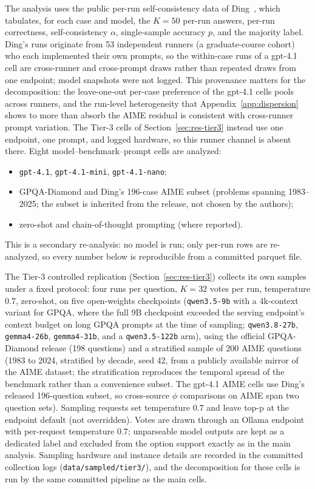 \documentclass{article}
\begin{document}
The analysis uses the public per-run self-consistency data of Ding~\cite{ding2026auditing}, which tabulates, for each case and model,
the $K=50$ per-run answers, per-run correctness, self-consistency $\alpha$, single-sample accuracy $p$, and the majority label.
Ding's runs originate from 53 independent runners (a graduate-course cohort) who each implemented their own prompts, so the within-case runs of a gpt-4.1 cell are cross-runner and cross-prompt draws rather than repeated draws from one endpoint; model snapshots were not logged. This provenance matters for the decomposition: the leave-one-out per-case preference of the gpt-4.1 cells pools across runners, and the run-level heterogeneity that Appendix~\ref{app:dispersion} shows to more than absorb the AIME residual is consistent with cross-runner prompt variation. The Tier-3 cells of Section~\ref{sec:res-tier3} instead use one endpoint, one prompt, and logged hardware, so this runner channel is absent there. Eight model--benchmark--prompt cells are analyzed:
\begin{itemize}
\item \texttt{gpt-4.1}, \texttt{gpt-4.1-mini}, \texttt{gpt-4.1-nano};
\item GPQA-Diamond and Ding's 196-case AIME subset (problems spanning
  1983--2025; the subset is inherited from the release, not chosen by the authors);
\item zero-shot and chain-of-thought prompting (where reported).
\end{itemize}
This is a secondary re-analysis: no model is run; only per-run rows are re-analyzed, so every number below is reproducible from a
committed parquet file.

The Tier-3 controlled replication (Section~\ref{sec:res-tier3})
collects its own samples under a fixed protocol: four runs per question,
$K=32$ votes per run, temperature $0.7$, zero-shot, on five
open-weights checkpoints (\texttt{qwen3.5-9b} with a 4k-context variant for
GPQA, where the full 9B checkpoint exceeded the serving endpoint's
context budget on long GPQA prompts at the time of sampling;
\texttt{qwen3.8-27b}, \texttt{gemma4-26b}, \texttt{gemma4-31b},
and a \texttt{qwen3.5-122b} arm), using the official GPQA-Diamond release
(198 questions) and a stratified sample of 200 AIME questions (1983 to
2024, stratified by decade, seed 42, from a publicly available mirror of the AIME
dataset; the stratification reproduces the temporal spread of the
benchmark rather than a convenience subset. The gpt-4.1 AIME cells use
Ding's released 196-question subset, so cross-source $\phi$ comparisons
on AIME span two question sets).
Sampling requests set temperature $0.7$ and leave top-p at the
endpoint default (not overridden). Votes are drawn through an
Ollama endpoint with per-request temperature $0.7$; unparseable model
outputs are kept as a dedicated label and excluded from the option
support exactly as in the main analysis. Sampling hardware and instance
details are recorded in the committed collection logs
(\texttt{data/sampled/tier3/}), and the decomposition for these cells is
run by the same committed pipeline as the main cells.
\end{document}
